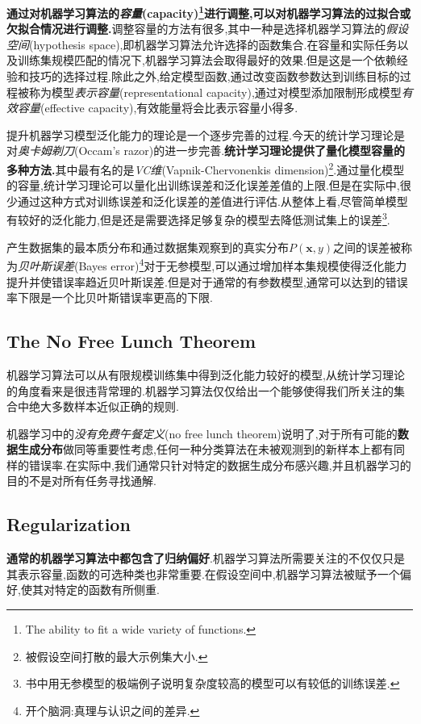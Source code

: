 \textbf{通过对机器学习算法的\textit{容量}(capacity)\footnote{The ability to fit a wide variety of functions.}进行调整,可以对机器学习算法的过拟合或欠拟合情况进行调整.}调整容量的方法有很多,其中一种是选择机器学习算法的\textit{假设空间}(hypothesis space),即机器学习算法允许选择的函数集合.在容量和实际任务以及训练集规模匹配的情况下,机器学习算法会取得最好的效果.但是这是一个依赖经验和技巧的选择过程.除此之外,给定模型函数,通过改变函数参数达到训练目标的过程被称为模型\textit{表示容量}(representational capacity),通过对模型添加限制形成模型\textit{有效容量}(effective capacity),有效能量将会比表示容量小得多.

 提升机器学习模型泛化能力的理论是一个逐步完善的过程.今天的统计学习理论是对\textit{奥卡姆剃刀}(Occam's razor)的进一步完善.\textbf{统计学习理论提供了量化模型容量的多种方法.}其中最有名的是\textit{VC维}(Vapnik-Chervonenkis dimension)\footnote{被假设空间打散的最大示例集大小.}.通过量化模型的容量,统计学习理论可以量化出训练误差和泛化误差差值的上限.但是在实际中,很少通过这种方式对训练误差和泛化误差的差值进行评估.从整体上看,尽管简单模型有较好的泛化能力,但是还是需要选择足够复杂的模型去降低测试集上的误差\footnote{书中用无参模型的极端例子说明复杂度较高的模型可以有较低的训练误差.}.

产生数据集的最本质分布和通过数据集观察到的真实分布$P(\bm x, y)$之间的误差被称为\textit{贝叶斯误差}(Bayes error)\footnote{开个脑洞:真理与认识之间的差异.}对于无参模型,可以通过增加样本集规模使得泛化能力提升并使错误率趋近贝叶斯误差.但是对于通常的有参数模型,通常可以达到的错误率下限是一个比贝叶斯错误率更高的下限.

\subsection{The No Free Lunch Theorem}

机器学习算法可以从有限规模训练集中得到泛化能力较好的模型,从统计学习理论的角度看来是很违背常理的.机器学习算法仅仅给出一个能够使得我们所关注的集合中绝大多数样本近似正确的规则.

机器学习中的\textit{没有免费午餐定义}(no free lunch theorem)说明了,对于所有可能的\textbf{数据生成分布}做同等重要性考虑,任何一种分类算法在未被观测到的新样本上都有同样的错误率.在实际中,我们通常只针对特定的数据生成分布感兴趣,并且机器学习的目的不是对所有任务寻找通解.

\subsection{Regularization}

\textbf{通常的机器学习算法中都包含了归纳偏好}.机器学习算法所需要关注的不仅仅只是其表示容量,函数的可选种类也非常重要.在假设空间中,机器学习算法被赋予一个偏好,使其对特定的函数有所侧重.

